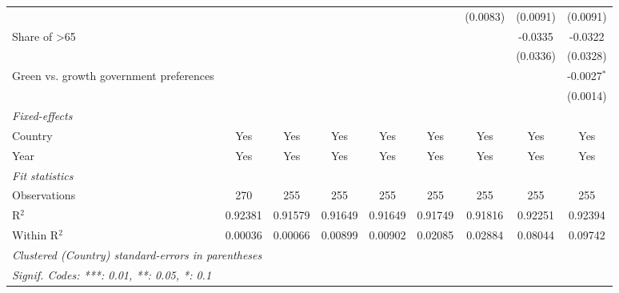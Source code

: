 \begin{table}[htbp]
\begin{tabular}{lcccccccc}
                                                                 &          &          &          &          &          & (0.0083) & (0.0091) & (0.0091)\\   
      Share of >65                                               &          &          &          &          &          &          & -0.0335  & -0.0322\\   
                                                                 &          &          &          &          &          &          & (0.0336) & (0.0328)\\   
      Green vs. growth government preferences                    &          &          &          &          &          &          &          & -0.0027$^{*}$\\   
                                                                 &          &          &          &          &          &          &          & (0.0014)\\   
      \midrule
      \emph{Fixed-effects}\\
      Country                                                    & Yes      & Yes      & Yes      & Yes      & Yes      & Yes      & Yes      & Yes\\  
      Year                                                       & Yes      & Yes      & Yes      & Yes      & Yes      & Yes      & Yes      & Yes\\  
      \midrule
      \emph{Fit statistics}\\
      Observations                                               & 270      & 255      & 255      & 255      & 255      & 255      & 255      & 255\\  
      R$^2$                                                      & 0.92381  & 0.91579  & 0.91649  & 0.91649  & 0.91749  & 0.91816  & 0.92251  & 0.92394\\  
      Within R$^2$                                               & 0.00036  & 0.00066  & 0.00899  & 0.00902  & 0.02085  & 0.02884  & 0.08044  & 0.09742\\  
      \midrule \midrule
      \multicolumn{9}{l}{\emph{Clustered (Country) standard-errors in parentheses}}\\
      \multicolumn{9}{l}{\emph{Signif. Codes: ***: 0.01, **: 0.05, *: 0.1}}\\
   \end{tabular}
\end{table}


